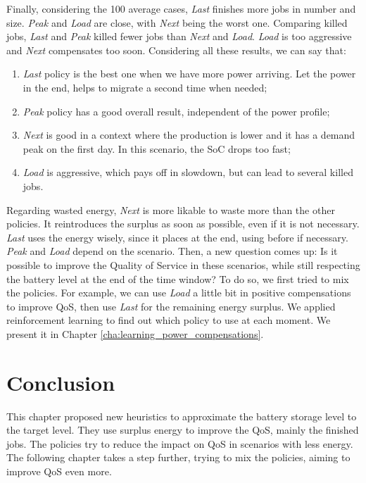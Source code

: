 Finally, considering the 100 average cases, \emph{Last} finishes more jobs in number and size. \emph{Peak} and \emph{Load} are close, with \emph{Next} being the worst one. Comparing killed jobs, \emph{Last} and \emph{Peak} killed fewer jobs than \emph{Next} and \emph{Load}. \emph{Load} is too aggressive and \emph{Next} compensates too soon. Considering all these results, we can say that: 
\begin{enumerate}
    \item \emph{Last} policy is the best one when we have more power arriving. Let the power in the end, helps to migrate a second time when needed;
    \item \emph{Peak} policy has a good overall result, independent of the power profile;
    \item \emph{Next} is good in a context where the production is lower and it has a demand peak on the first day. In this scenario, the SoC drops too fast;
    \item \emph{Load} is aggressive, which pays off in slowdown, but can lead to several killed jobs.
\end{enumerate}

Regarding wasted energy, \emph{Next} is more likable to waste more than the other policies. It reintroduces the surplus as soon as possible, even if it is not necessary. \emph{Last} uses the energy wisely, since it places at the end, using before if necessary. \emph{Peak} and \emph{Load} depend on the scenario. Then, a new question comes up: Is it possible to improve the Quality of Service in these scenarios, while still respecting the battery level at the end of the time window? To do so, we first tried to mix the policies. For example, we can use \emph{Load} a little bit in positive compensations to improve QoS, then use \emph{Last} for the remaining energy surplus. We applied reinforcement learning to find out which policy to use at each moment. We present it in Chapter \ref{cha:learning_power_compensations}. 

\section{Conclusion}
This chapter proposed new heuristics to approximate the battery storage level to the target level. They use surplus energy to improve the QoS, mainly the finished jobs. The policies try to reduce the impact on QoS in scenarios with less energy. The following chapter takes a step further, trying to mix the policies, aiming to improve QoS even more.
